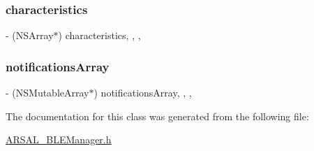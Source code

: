 \subsubsection{\texorpdfstring{characteristics}{characteristics}}
{\footnotesize\ttfamily -\/ (N\+S\+Array$\ast$) characteristics\hspace{0.3cm}{\ttfamily [read]}, {\ttfamily [write]}, {\ttfamily [nonatomic]}, {\ttfamily [retain]}}

\hypertarget{interfaceARSALBLEManagerNotification_a8584e955f261031e6e713dbe7d1a1879}{}\label{interfaceARSALBLEManagerNotification_a8584e955f261031e6e713dbe7d1a1879} 
\subsubsection{\texorpdfstring{notifications\+Array}{notificationsArray}}
{\footnotesize\ttfamily -\/ (N\+S\+Mutable\+Array$\ast$) notifications\+Array\hspace{0.3cm}{\ttfamily [read]}, {\ttfamily [write]}, {\ttfamily [nonatomic]}, {\ttfamily [retain]}}



The documentation for this class was generated from the following file\+:\begin{DoxyCompactItemize}
\item 
\hyperlink{ARSAL__BLEManager_8h}{A\+R\+S\+A\+L\+\_\+\+B\+L\+E\+Manager.\+h}\end{DoxyCompactItemize}
